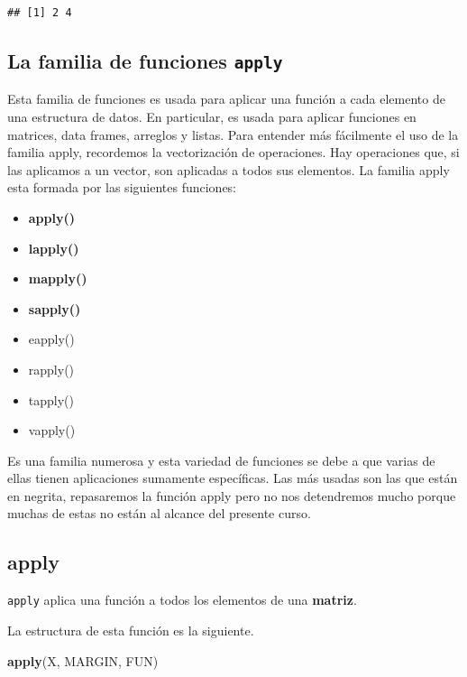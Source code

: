 \documentclass[
]{book}
\newenvironment{Shaded}{\begin{snugshade}}{\end{snugshade}}
\newcommand{\FunctionTok}[1]{\textcolor[rgb]{0.13,0.29,0.53}{\textbf{#1}}}
\newcommand{\NormalTok}[1]{#1}
\begin{document}
\begin{verbatim}
## [1] 2 4
\end{verbatim}

\subsection{\texorpdfstring{La familia de funciones \texttt{apply}}{La familia de funciones apply}}\label{la-familia-de-funciones-apply}

Esta familia de funciones es usada para aplicar una función a cada elemento de una estructura de datos.
En particular, es usada para aplicar funciones en matrices, data frames, arreglos y listas.
Para entender más fácilmente el uso de la familia apply, recordemos la vectorización de operaciones.
Hay operaciones que, si las aplicamos a un vector, son aplicadas a todos sus elementos.
La familia apply esta formada por las siguientes funciones:

\begin{itemize}
\item
  \textbf{apply()}
\item
  \textbf{lapply()}
\item
  \textbf{mapply()}
\item
  \textbf{sapply()}
\item
  eapply()
\item
  rapply()
\item
  tapply()
\item
  vapply()
\end{itemize}

Es una familia numerosa y esta variedad de funciones se debe a que varias de ellas tienen aplicaciones sumamente específicas.
Las más usadas son las que están en negrita, repasaremos la función apply pero no nos detendremos mucho porque muchas de estas no están al alcance del presente curso.

\subsection{apply}\label{apply}

\texttt{apply} aplica una función a todos los elementos de una \textbf{matriz}.

La estructura de esta función es la siguiente.

\begin{Shaded}
\begin{Highlighting}[]
\FunctionTok{apply}\NormalTok{(X, MARGIN, FUN)}
\end{Highlighting}
\end{Shaded}
\end{document}
